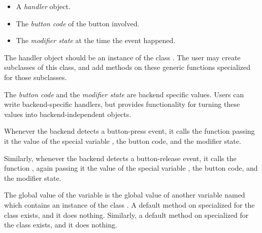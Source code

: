 \begin{itemize}
\item A \emph{handler} object.
\item The \emph{button code} of the button involved.
\item The \emph{modifier state} at the time the event happened.
\end{itemize}

The handler object should be an instance of the class
.  The user may create subclasses of this class,
and add methods on these generic functions specialized for those
subclasses.

The \emph{button code} and the \emph{modifier state} are backend
specific values.  Users can write backend-specific handlers, but
\clim{} provides functionality for turning these values into
backend-independent objects. 

Whenever the backend detects a button-press event, it calls the function
 passing it the value of the special variable
, the button code, and the modifier state. 

Similarly, whenever the backend detects a button-release event, it calls
the function , again passing it the value of
the special variable , the button code, and the
modifier state.

The global value of the variable  is the global
value of another variable named  which
contains an instance of the class .  A
default method on  specialized for the
 class exists, and it does nothing.  Similarly,
a default method on  specialized for the
 class exists, and it does nothing.

